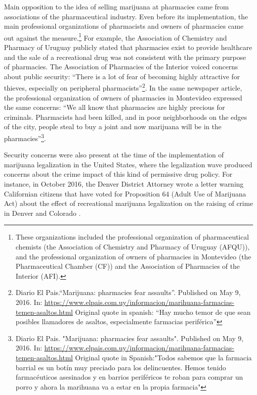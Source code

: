 \documentclass[11pt]{article}
\begin{document}
Main opposition to the idea of selling marijuana at pharmacies came from associations of the pharmaceutical industry. Even before its implementation, the main professional organizations of pharmacists and owners of pharmacies came out against the measure.\footnote{These organizations included the professional organization of pharmaceutical chemists (the Association of Chemistry and Pharmacy of Uruguay (AFQU)), and the professional organization of owners of pharmacies in Montevideo (the Pharmaceutical Chamber (CF)) and the Association of Pharmacies of the Interior (AFI).} For example, the Association of Chemistry and Pharmacy of Uruguay publicly stated that pharmacies exist to provide healthcare and the sale of a recreational drug was not consistent with the primary purpose of pharmacies. The Association of Pharmacies of the Interior voiced concerns about public security: ``There is a lot of fear of becoming highly attractive for thieves, especially on peripheral pharmacists''\footnote{Diario El Pais.``Marijuana: pharmacies fear assaults''. Published on May 9, 2016. In: \url{https://www.elpais.com.uy/informacion/marihuana-farmacias-temen-asaltos.html} Original quote in spanish: ``Hay mucho temor de que sean posibles llamadores de asaltos, especialmente farmacias periférica''}. In the same newspaper article, the professional organization of owners of pharmacies in Montevideo expressed the same concerns: ``We all know that pharmacies are highly precious for criminals. Pharmacists had been killed, and in poor neighborhoods on the edges of the city, people steal to buy a joint and now marijuana will be in the pharmacies''\footnote{Diario El Pais. "Marijuana: pharmacies fear assaults". Published on May 9, 2016. In: \url{https://www.elpais.com.uy/informacion/marihuana-farmacias-temen-asaltos.html} Original quote in Spanish:"Todos sabemos que la farmacia barrial es un botín muy preciado para los delincuentes. Hemos tenido farmacéuticos asesinados y en barrios periféricos te roban para comprar un porro y ahora la marihuana va a estar en la propia farmacia"}.

Security concerns were also present at the time of the implementation of marijuana legalization in the United States, where the legalization wave produced concerns about the crime impact of this kind of permissive drug policy. For instance, in October 2016, the Denver District Attorney wrote a letter warning Californian citizens that have voted for Proposition 64 (Adult Use of Marijuana Act) about the effect of recreational marijuana legalization on the raising of crime in Denver and Colorado \citep{dragone2019crime}.
\end{document}
